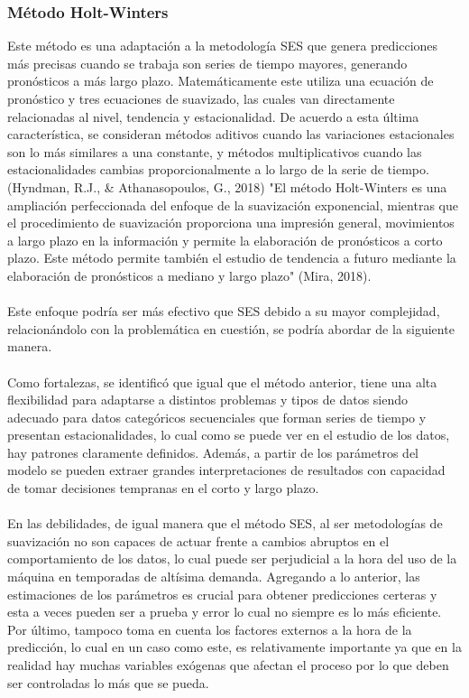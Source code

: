 \documentclass[10pt]{article}
\begin{document}
\subsubsection{Método Holt-Winters}
Este método es una adaptación a la metodología SES que genera predicciones más precisas cuando se trabaja son series de tiempo mayores, generando pronósticos a más largo plazo. Matemáticamente este utiliza una ecuación de pronóstico y tres ecuaciones de suavizado, las cuales van directamente relacionadas al nivel, tendencia y estacionalidad. De acuerdo a esta última característica, se consideran métodos aditivos cuando las variaciones estacionales son lo más similares a una constante, y métodos multiplicativos cuando las estacionalidades cambias proporcionalmente a lo largo de la serie de tiempo. (Hyndman, R.J., \& Athanasopoulos, G., 2018)
"El método Holt-Winters es una ampliación perfeccionada del enfoque de la suavización exponencial, mientras que el procedimiento de suavización proporciona una impresión general, movimientos a largo plazo en la información y permite la elaboración de pronósticos a corto plazo. Este método permite también el estudio de tendencia a futuro mediante la elaboración de pronósticos a mediano y largo plazo" (Mira, 2018). \\
\\
Este enfoque podría ser más efectivo que SES debido a su mayor complejidad, relacionándolo con la problemática en cuestión, se podría abordar de la siguiente manera. \\
\\
Como fortalezas, se identificó que igual que el método anterior, tiene una alta flexibilidad para adaptarse a distintos problemas y tipos de datos siendo adecuado para datos categóricos secuenciales que forman series de tiempo y presentan estacionalidades, lo cual como se puede ver en el estudio de los datos, hay patrones claramente definidos. Además, a partir de los parámetros del modelo se pueden extraer grandes interpretaciones de resultados con capacidad de tomar decisiones tempranas en el corto y largo plazo.  \\
\\
En las debilidades, de igual manera que el método SES, al ser metodologías de suavización no son capaces de actuar frente a cambios abruptos en el comportamiento de los datos, lo cual puede ser perjudicial a la hora del uso de la máquina en temporadas de altísima demanda. Agregando a lo anterior, las estimaciones de los parámetros es crucial para obtener predicciones certeras y esta a veces pueden ser a prueba y error lo cual no siempre es lo más eficiente. Por último, tampoco toma en cuenta los factores externos a la hora de la predicción, lo cual en un caso como este, es relativamente importante ya que en la realidad hay muchas variables exógenas que afectan el proceso por lo que deben ser controladas lo más que se pueda. \\
\end{document}
